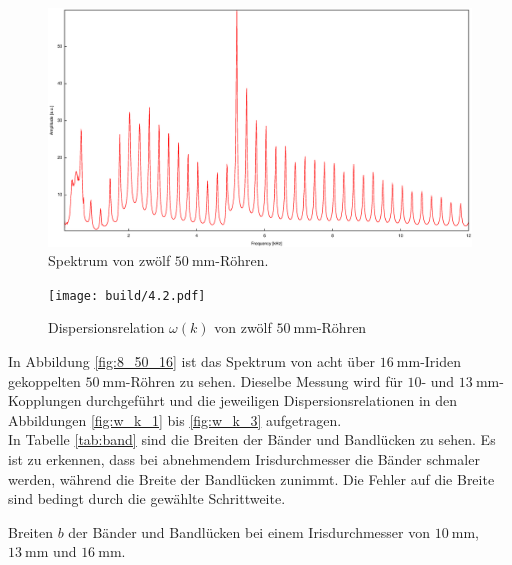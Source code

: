 \begin{figure}
\centering
\includegraphics[width=\linewidth-60pt,height=\textheight-60pt,keepaspectratio]{FP-V23data/4.2_600mm.eps}
\caption{Spektrum von zwölf $\SI{50}{\milli\meter}$-Röhren.}
\label{fig:12_50}
\end{figure}

\begin{figure}
\centering
\texttt{[image: build/4.2.pdf]}
\caption{Dispersionsrelation $\omega(k)$ von zwölf $\SI{50}{\milli\meter}$-Röhren}
\label{fig:w_k}
\end{figure}

\newpage
\noindent In Abbildung \ref{fig:8_50_16} ist das Spektrum von acht über $\SI{16}{\milli\meter}$-Iriden gekoppelten $\SI{50}{\milli\meter}$-Röhren zu sehen. Dieselbe Messung wird für $10$- und $\SI{13}{\milli\meter}$-Kopplungen durchgeführt und die jeweiligen Dispersionsrelationen in den Abbildungen \ref{fig:w_k_1} bis \ref{fig:w_k_3} aufgetragen.\\
In Tabelle \ref{tab:band} sind die Breiten der Bänder und Bandlücken zu sehen. Es ist zu erkennen, dass bei abnehmendem Irisdurchmesser die Bänder schmaler werden, während die Breite der Bandlücken zunimmt. Die Fehler auf die Breite sind bedingt durch die gewählte Schrittweite.\\

\begin{table}
\caption{Breiten $b$ der Bänder und Bandlücken bei einem Irisdurchmesser von $\SI{10}{\milli\metre}$, $\SI{13}{\milli\metre}$ und $\SI{16}{\milli\metre}$.}
\centering

\label{tab:band}
\end{table}

